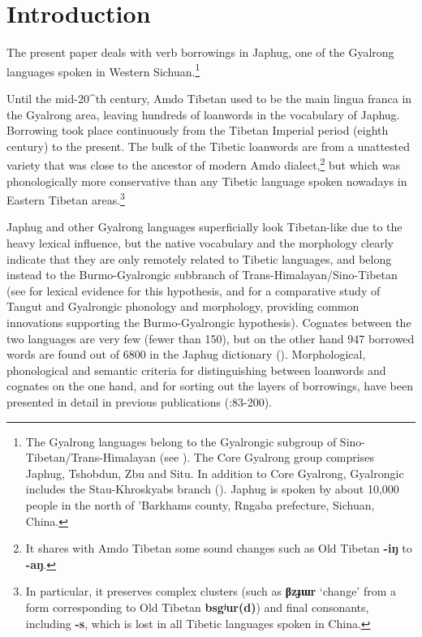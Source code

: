 \documentclass[oneside,a4paper,11pt]{article}
\newcommand{\ipa}[1]{{\phon\textbf{\mbox{#1}}}} %
\begin{document}
\section{Introduction}
The present paper deals with verb borrowings in Japhug, one of the Gyalrong languages spoken in Western Sichuan.\footnote{The Gyalrong languages belong to the Gyalrongic subgroup of Sino-Tibetan/Trans-Himalayan (see \citealt{jackson00puxi}). The Core Gyalrong group comprises Japhug, Tshobdun, Zbu and Situ. In addition to Core Gyalrong, Gyalrongic includes the Stau-Khroskyabs branch (\citealt{lai15person}). Japhug is spoken by about 10,000 people in the north of 'Barkhams county, Rngaba prefecture, Sichuan, China. } 

Until the mid-20^{th} century, Amdo Tibetan used to be the main lingua franca in the Gyalrong area, leaving hundreds of loanwords in the vocabulary of Japhug. Borrowing took place continuously from the Tibetan Imperial period (eighth century) to the present. The bulk of the Tibetic loanwords are from a unattested variety that was close to the ancestor of modern Amdo dialect,\footnote{It shares with Amdo Tibetan some sound changes such as Old Tibetan \ipa{-iŋ} to \ipa{-aŋ}. } but which was phonologically more conservative than any Tibetic language spoken nowadays in Eastern Tibetan areas.\footnote{In particular, it preserves complex clusters (such as \ipa{βzɟɯr} `change' from a form corresponding to Old Tibetan \ipa{bsgʲur(d)}) and final consonants, including \ipa{-s}, which is lost in all Tibetic languages spoken in China.} 

Japhug and other Gyalrong languages superficially look Tibetan-like due to the heavy lexical influence, but the native vocabulary and the morphology clearly indicate that they are only remotely related to Tibetic languages, and belong instead to the Burmo-Gyalrongic subbranch of Trans-Himalayan/Sino-Tibetan (see \citealt{jacques.michaud11naish} for lexical evidence for this hypothesis, and \citealt{jacques14esquisse} for a comparative study of Tangut and Gyalrongic phonology and morphology, providing common innovations supporting the Burmo-Gyalrongic hypothesis). Cognates between the two languages are very few (fewer than 150), but on the other hand 947 borrowed words are found out of 6800 in the Japhug dictionary (\citealt{jacques15japhug}). Morphological, phonological and semantic criteria for distinguishing between loanwords and cognates on the one hand, and for sorting out the layers of borrowings, have been presented in detail in previous publications (\citealt{jacques04these}:83-200). 
\end{document}
